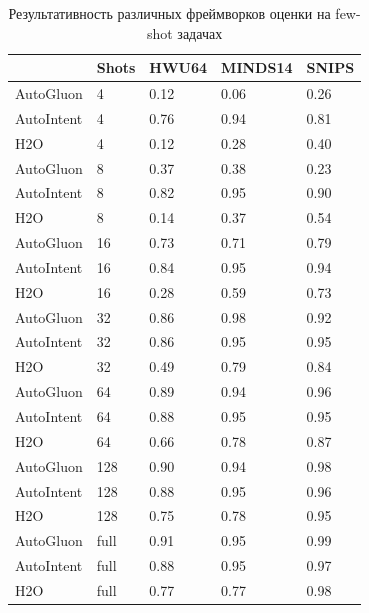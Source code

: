 \documentclass[14pt,a4paper,oneside,openany]{extbook}
\begin{document}
\begin{table}[h!]
\caption{\label{tbl:few_shot_comparison}Результативность различных фреймворков оценки на few-shot задачах}
\centering
\begin{tabular}{|p{3cm}|p{2cm}|p{2cm}|p{2cm}|p{2cm}|}
\hline
 & Shots & HWU64 & MINDS14 & SNIPS\\
\hline
AutoGluon & 4 & 0.12 & 0.06 & 0.26\\
\hline
AutoIntent & 4 & 0.76 & 0.94 & 0.81\\
\hline
H2O & 4 & 0.12 & 0.28 & 0.40\\
\hline
AutoGluon & 8 & 0.37 & 0.38 & 0.23\\
\hline
AutoIntent & 8 & 0.82 & 0.95 & 0.90\\
\hline
H2O & 8 & 0.14 & 0.37 & 0.54\\
\hline
AutoGluon & 16 & 0.73 & 0.71 & 0.79\\
\hline
AutoIntent & 16 & 0.84 & 0.95 & 0.94\\
\hline
H2O & 16 & 0.28 & 0.59 & 0.73\\
\hline
AutoGluon & 32 & 0.86 & 0.98 & 0.92\\
\hline
AutoIntent & 32 & 0.86 & 0.95 & 0.95\\
\hline
H2O & 32 & 0.49 & 0.79 & 0.84\\
\hline
AutoGluon & 64 & 0.89 & 0.94 & 0.96\\
\hline
AutoIntent & 64 & 0.88 & 0.95 & 0.95\\
\hline
H2O & 64 & 0.66 & 0.78 & 0.87\\
\hline
AutoGluon & 128 & 0.90 & 0.94 & 0.98\\
\hline
AutoIntent & 128 & 0.88 & 0.95 & 0.96\\
\hline
H2O & 128 & 0.75 & 0.78 & 0.95\\
\hline
AutoGluon & full & 0.91 & 0.95 & 0.99\\
\hline
AutoIntent & full & 0.88 & 0.95 & 0.97\\
\hline
H2O & full & 0.77 & 0.77 & 0.98\\
\hline
\end{tabular}
\end{table}
\end{document}
